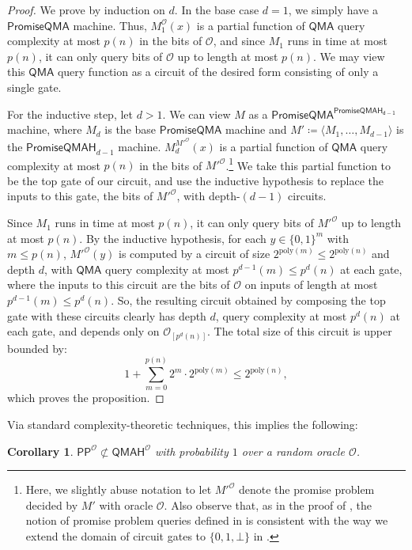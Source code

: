 \documentclass[10pt,a4paper]{article}
\newtheorem{corollary}[theorem]{Corollary}
\newcommand{\poly}{\mathrm{poly}}
\begin{document}
\begin{proof}
We prove by induction on $d$. In the base case $d = 1$, we simply have a $\mathsf{PromiseQMA}$ machine. Thus, $M_1^\mathcal{O}(x)$ is a partial function of $\mathsf{QMA}$ query complexity at most $p(n)$ in the bits of $\mathcal{O}$, and since $M_1$ runs in time at most $p(n)$, it can only query bits of $\mathcal{O}$ up to length at most $p(n)$. We may view this $\mathsf{QMA}$ query function as a circuit of the desired form consisting of only a single gate.

For the inductive step, let $d > 1$. We can view $M$ as a $\mathsf{PromiseQMA}^\mathsf{PromiseQMAH_{d-1}}$ machine, where $M_d$ is the base $\mathsf{PromiseQMA}$ machine and $M' \coloneqq \langle M_1,\ldots,M_{d-1} \rangle$ is the $\mathsf{PromiseQMAH}_{d-1}$ machine. $M_d^{M'^{\mathcal{O}}}(x)$ is a partial function of $\mathsf{QMA}$ query complexity at most $p(n)$ in the bits of $M'^{\mathcal{O}}$.\footnote{Here, we slightly abuse notation to let $M'^{\mathcal{O}}$ denote the promise problem decided by $M'$ with oracle $\mathcal{O}$. Also observe that, as in the proof of , the notion of promise problem queries defined in  is consistent with the way we extend the domain of circuit gates to $\{0,1,\bot\}$ in .} We take this partial function to be the top gate of our circuit, and use the inductive hypothesis to replace the inputs to this gate, the bits of $M'^{\mathcal{O}}$, with depth-$(d-1)$ circuits.

Since $M_1$ runs in time at most $p(n)$, it can only query bits of $M'^{\mathcal{O}}$ up to length at most $p(n)$. By the inductive hypothesis, for each $y \in \{0,1\}^{m}$ with $m \le p(n)$, $M'^{\mathcal{O}}(y)$ is computed by a circuit of size $2^{\poly(m)} \le 2^{\poly(n)}$ and depth $d$, with $\mathsf{QMA}$ query complexity at most $p^{d-1}(m) \le p^d(n)$ at each gate, where the inputs to this circuit are the bits of $\mathcal{O}$ on inputs of length at most $p^{d-1}(m) \le p^d(n)$. So, the resulting circuit obtained by composing the top gate with these circuits clearly has depth $d$, query complexity at most $p^d(n)$ at each gate, and depends only on $\mathcal{O}_{[p^d(n)]}$. The total size of this circuit is upper bounded by:
\[
1 + \sum_{m=0}^{p(n)} 2^{m} \cdot 2^{\poly(m)} \le 2^{\poly(n)},
\]
which proves the proposition.
\end{proof}

Via standard complexity-theoretic techniques, this implies the following:
\begin{corollary}
\label{cor:pp_not_in_qmah}
$\mathsf{PP}^\mathcal{O}\not \subset \mathsf{QMAH}^\mathcal{O}$ with probability $1$ over a random oracle $\mathcal{O}$.
\end{corollary}
\end{document}
